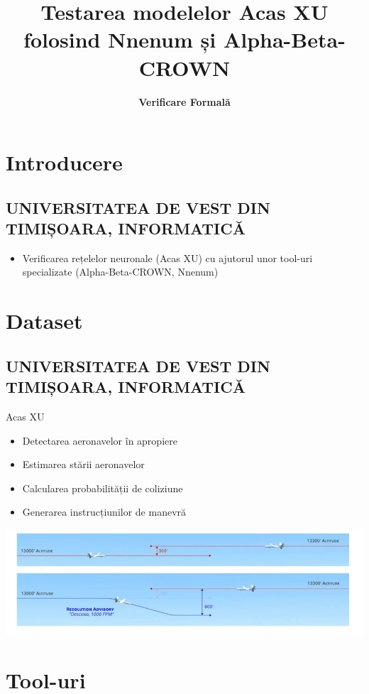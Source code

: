 \documentclass{beamer}
\title[Testarea modelelor Acas XU folosind Nnenum și Alpha-Beta-CROWN]
{Testarea modelelor Acas XU folosind Nnenum și Alpha-Beta-CROWN}
\author[Vicol Mihai, Oșan Mihai, Bîzdoacă Mihai, Bogdan Topliceanu]
 {\textbf{Verificare Formală}}
\begin{document}
\begin{frame}
\titlepage
\end{frame}
\section{Introducere}
\subsection{UNIVERSITATEA DE VEST DIN TIMIȘOARA, INFORMATICĂ}
\begin{frame}
\begin{itemize}
	\item Verificarea rețelelor neuronale (Acas XU) cu ajutorul unor tool-uri specializate (Alpha-Beta-CROWN, Nnenum)
\end{itemize}

\end{frame}

\section{Dataset}
\subsection{UNIVERSITATEA DE VEST DIN TIMIȘOARA, INFORMATICĂ}
\begin{frame}
Acas XU
\begin{itemize}
  \item 	Detectarea aeronavelor în apropiere
  \item Estimarea stării aeronavelor
  \item Calcularea probabilității de coliziune
  \item Generarea instrucțiunilor de manevră

 \end{itemize}
\end{frame}
\begin{frame}
\includegraphics[scale=0.6]{acasxu.png}
\end{frame}

\section{Tool-uri}
\end{document}
